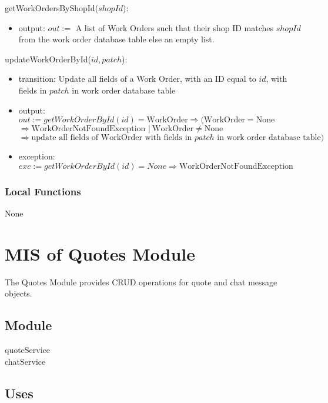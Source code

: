 \documentclass[12pt, titlepage]{article}
\begin{document}
\noindent getWorkOrdersByShopId($shopId$):
\begin{itemize}
	\item output: $out :=$ A list of Work Orders such that their shop ID matches $shopId$ from the work order
	      database table else an empty list.
\end{itemize}

\noindent updateWorkOrderById($id, patch$):
\begin{itemize}
	\item transition: Update all fields of a Work Order, with an ID equal to $id$, with fields in $patch$ in
	      work order database table
	\item output: $out := getWorkOrderById(id) = \text{WorkOrder} \Rightarrow (\text{WorkOrder} = \text{None}
		      $ \\ $\Rightarrow \text{WorkOrderNotFoundException } |\ \text{WorkOrder} \neq \text{None}$ \\
		      $\Rightarrow \text{update all fields of WorkOrder with fields in } patch \text{ in work order
			      database table})$
	\item exception: $exc := getWorkOrderById(id) = None \Rightarrow \text{WorkOrderNotFoundException}$
\end{itemize}

\subsubsection{Local Functions}

None

\newpage

\section{MIS of Quotes Module} \label{mQuotes}

The Quotes Module provides CRUD operations for quote and chat message objects.

\subsection{Module}

quoteService \\ chatService

\subsection{Uses}
\end{document}
